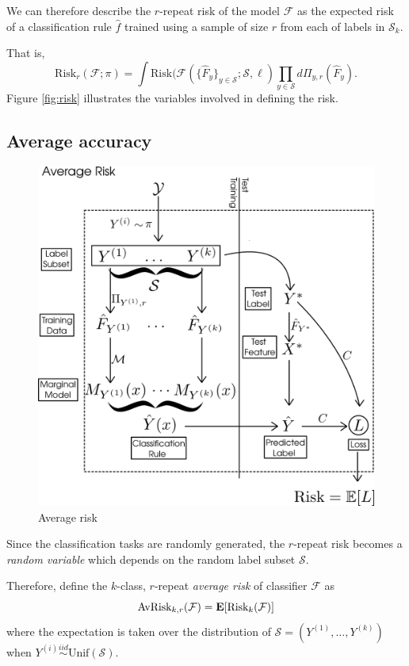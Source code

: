 We can therefore describe the $r$-repeat risk of the model $\mathcal{F}$
as the expected risk of a classification rule $\hat{f}$ trained 
using a sample of size $r$ from each of labels in $\mathcal{S}_k$.

That is,
\[
\text{Risk}_r(\mathcal{F}; \pi) =
\int \text{Risk}(\mathcal{F}(\{\hat{F}_y\}_{y \in \mathcal{S}}; \mathcal{S}, \ell) \prod_{y \in \mathcal{S}} d\Pi_{y, r}(\hat{F}_y).
\]
Figure \ref{fig:risk} illustrates the variables involved in defining
the risk.


\subsection{Average accuracy}

\begin{figure}[h]
\centering
\includegraphics[scale = 0.3]{../extrapolation_figures/average_risk.png}
\caption{Average risk}\label{fig:average_risk}
\end{figure}

Since the classification tasks are randomly generated, the $r$-repeat
risk becomes a \emph{random variable} which depends on the random
label subset $\mathcal{S}$.

Therefore, define the $k$-class, $r$-repeat \emph{average risk} of
classifier $\mathcal{F}$ as
\[
\text{AvRisk}_{k, r}(\mathcal{F}) = \textbf{E}[\text{Risk}_k(\mathcal{F})]
\]
where the expectation is taken over the distribution of $\mathcal{S} =
(Y^{(1)},\hdots, Y^{(k)})$ when $Y^{(i)} \stackrel{iid}{\sim} \text{Unif}(\mathcal{S}).$

